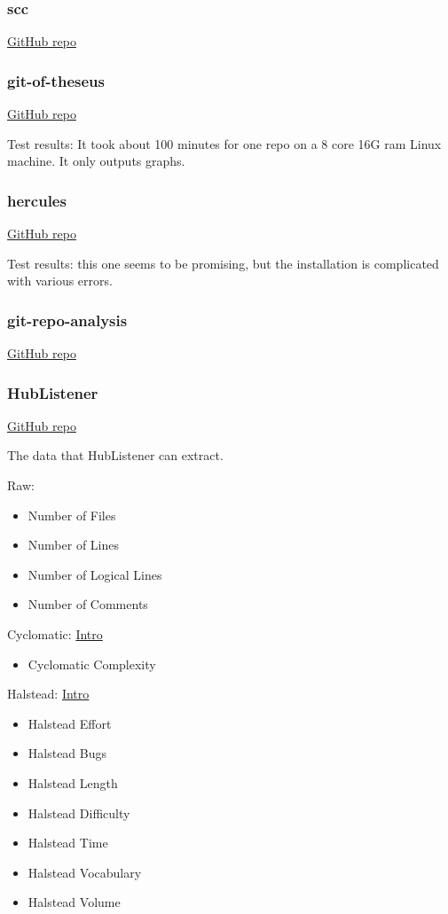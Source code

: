 \documentclass[letterpaper,cleveref]{lipics-v2019}
\theoremstyle{definition}
\begin{document}
\subsubsection{scc}
\href{https://github.com/boyter/scc}{GitHub repo}


\subsubsection{git-of-theseus}
\href{https://github.com/erikbern/git-of-theseus}{GitHub repo}

Test results: It took about 100 minutes for one repo on a 8 core 16G ram Linux
machine. It only outputs graphs.

\subsubsection{hercules}
\href{https://github.com/src-d/hercules}{GitHub repo}

Test results: this one seems to be promising, but the installation is
complicated with various errors.

\subsubsection{git-repo-analysis}
\href{https://github.com/larsxschneider/git-repo-analysis}{GitHub repo}

\subsubsection{HubListener}
\href{https://github.com/pjmc-oliveira/HubListener}{GitHub repo}

The data that HubListener can extract.

Raw:
\begin{itemize}
	\item Number of Files
	\item Number of Lines
	\item Number of Logical Lines
	\item Number of Comments
\end{itemize}

Cyclomatic:
\href{https://www.geeksforgeeks.org/cyclomatic-complexity/}{Intro}
\begin{itemize}
	\item Cyclomatic Complexity
\end{itemize}

Halstead:
\href{https://www.geeksforgeeks.org/software-engineering-halsteads-software-metrics/}{Intro}
\begin{itemize}
	\item Halstead Effort
	\item Halstead Bugs
	\item Halstead Length
	\item Halstead Difficulty
	\item Halstead Time
	\item Halstead Vocabulary
	\item Halstead Volume
\end{itemize}
\end{document}
